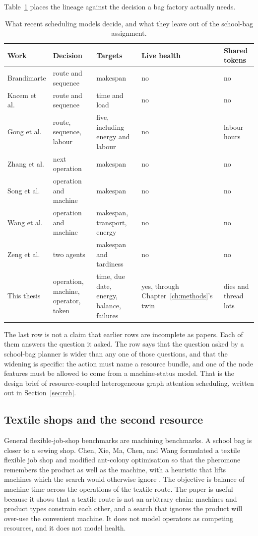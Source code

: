 Table~\ref{tab:sched-lineage} places the lineage against the decision a bag factory actually needs.

\begin{table}[ht]
\centering
\caption{What recent scheduling models decide, and what they leave out of the school-bag assignment.}
\label{tab:sched-lineage}
\small
\begin{tabularx}{\textwidth}{@{}lXXXX@{}}
\toprule
Work & Decision & Targets & Live health & Shared tokens \\
\midrule
Brandimarte \cite{brandimarte1993} & route and sequence & makespan & no & no \\
Kacem et al. \cite{kacem2002} & route and sequence & time and load & no & no \\
Gong et al. \cite{gong2019} & route, sequence, labour & five, including energy and labour & no & labour hours \\
Zhang et al. \cite{zhang2020} & next operation & makespan & no & no \\
Song et al. \cite{song2023} & operation and machine & makespan & no & no \\
Wang et al. \cite{wang2025} & operation and machine & makespan, transport, energy & no & no \\
Zeng et al. \cite{zeng2025} & two agents & makespan and tardiness & no & no \\
This thesis & operation, machine, operator, token & time, due date, energy, balance, failures & yes, through Chapter~\ref{ch:methods}'s twin & dies and thread lots \\
\bottomrule
\end{tabularx}
\end{table}

The last row is not a claim that earlier rows are incomplete as papers. Each of them answers the question it asked. The row says that the question asked by a school-bag planner is wider than any one of those questions, and that the widening is specific: the action must name a resource bundle, and one of the node features must be allowed to come from a machine-status model. That is the design brief of resource-coupled heterogeneous graph attention scheduling, written out in Section~\ref{sec:rch}.

\subsection{Textile shops and the second resource}

General flexible-job-shop benchmarks are machining benchmarks. A school bag is closer to a sewing shop. Chen, Xie, Ma, Chen, and Wang formulated a textile flexible job shop and modified ant-colony optimisation so that the pheromone remembers the product as well as the machine, with a heuristic that lifts machines which the search would otherwise ignore \cite{chen2024}. The objective is balance of machine time across the operations of the textile route. The paper is useful because it shows that a textile route is not an arbitrary chain: machines and product types constrain each other, and a search that ignores the product will over-use the convenient machine. It does not model operators as competing resources, and it does not model health.

